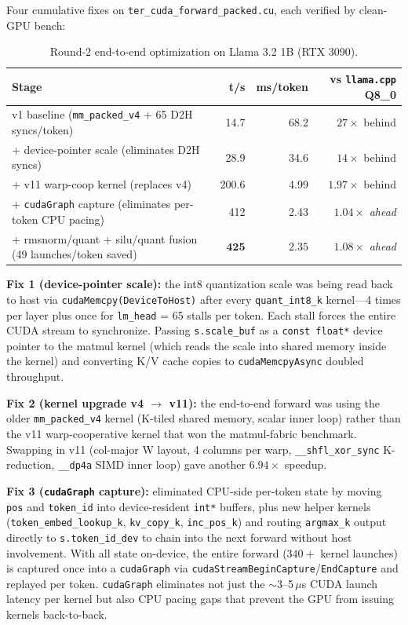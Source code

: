 \documentclass{article}
\begin{document}
Four cumulative fixes on \texttt{ter\_cuda\_forward\_packed.cu}, each
verified by clean-{GPU} bench:

\begin{table}[h]
\centering
\caption{Round-2 end-to-end optimization on Llama 3.2 1B (RTX 3090).}
\begin{tabular}{lrrr}
\toprule
Stage & t/s & ms/token & vs \texttt{llama.cpp} {Q8\_0} \\
\midrule
v1 baseline (\texttt{mm\_packed\_v4} + 65 D2H syncs/token) & 14.7 & 68.2 & $27\times$ behind \\
+ device-pointer scale (eliminates D2H syncs) & 28.9 & 34.6 & $14\times$ behind \\
+ v11 warp-coop kernel (replaces v4) & 200.6 & 4.99 & $1.97\times$ behind \\
+ \texttt{cudaGraph} capture (eliminates per-token CPU pacing) & 412 & 2.43 & $\mathbf{1.04\times}$ \emph{ahead} \\
+ rmsnorm/quant + silu/quant fusion (49 launches/token saved) & $\mathbf{425}$ & $\mathbf{2.35}$ & $\mathbf{1.08\times}$ \emph{ahead} \\
\bottomrule
\end{tabular}
\end{table}

\textbf{Fix 1 (device-pointer scale):} the int8 quantization scale was
being read back to host via \texttt{cudaMemcpy(DeviceToHost)} after
every \texttt{quant\_int8\_k} kernel---4 times per layer plus once for
\texttt{lm\_head} = 65 stalls per token. Each stall forces the entire
{CUDA} stream to synchronize. Passing \texttt{s.scale\_buf} as a
\texttt{const float*} device pointer to the matmul kernel (which reads
the scale into shared memory inside the kernel) and converting K/V
cache copies to \texttt{cudaMemcpyAsync} doubled throughput.

\textbf{Fix 2 (kernel upgrade v4 $\rightarrow$ v11):} the end-to-end
forward was using the older \texttt{mm\_packed\_v4} kernel (K-tiled
shared memory, scalar inner loop) rather than the v11
warp-cooperative kernel that won the matmul-fabric benchmark.
Swapping in v11 (col-major W layout, 4 columns per warp,
\texttt{\_\_shfl\_xor\_sync} K-reduction, \texttt{\_\_dp4a} {SIMD}
inner loop) gave another $6.94\times$ speedup.

\textbf{Fix 3 (\texttt{cudaGraph} capture):} eliminated {CPU}-side
per-token state by moving \texttt{pos} and \texttt{token\_id} into
device-resident \texttt{int*} buffers, plus new helper kernels
(\texttt{token\_embed\_lookup\_k}, \texttt{kv\_copy\_k},
\texttt{inc\_pos\_k}) and routing \texttt{argmax\_k} output directly to
\texttt{s.token\_id\_dev} to chain into the next forward without host
involvement. With all state on-device, the entire forward
($340+$ kernel launches) is captured once into a \texttt{cudaGraph}
via \texttt{cudaStreamBeginCapture}/\texttt{EndCapture} and replayed
per token. \texttt{cudaGraph} eliminates not just the $\sim$3--5\,$\mu$s
{CUDA} launch latency per kernel but also {CPU} pacing gaps that
prevent the {GPU} from issuing kernels back-to-back.
\end{document}
